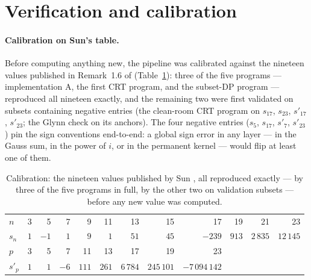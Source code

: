 \documentclass[10pt]{article}
\theoremstyle{remark}
\begin{document}
\section{Verification and calibration}\label{sec:verification}

\paragraph{Calibration on Sun's table.}
Before computing anything new, the pipeline was calibrated against the
nineteen values published in Remark~1.6 of \cite{Sun2021}
(Table~\ref{tab:calibration}): three of the five programs ---
implementation A, the first CRT program, and the subset-DP program ---
reproduced all nineteen exactly, and the remaining two were first
validated on subsets containing negative entries (the clean-room CRT
program on $s_{17}$, $s_{23}$, $s'_{17}$, $s'_{23}$; the Glynn check on
its anchors). The four negative entries ($s_5$, $s_{17}$, $s'_7$,
$s'_{23}$) pin the sign conventions end-to-end: a global sign error in any
layer --- in the Gauss sum, in the power of $i$, or in the permanent
kernel --- would flip at least one of them.

\begin{table}[ht]
\centering\footnotesize
\setlength{\tabcolsep}{5.5pt}
\begin{tabular}{@{}lrrrrrrrrrrr@{}}
\toprule
$n$    & 3 & 5 & 7 & 9 & 11 & 13 & 15 & 17 & 19 & 21 & 23 \\
$s_n$  & $1$ & $-1$ & $1$ & $9$ & $1$ & $51$ & $45$ & $-239$ & $913$ & $2\,835$ & $12\,145$ \\
\midrule
$p$    & 3 & 5 & 7 & 11 & 13 & 17 & 19 & 23 & & & \\
$s'_p$ & $1$ & $1$ & $-6$ & $111$ & $261$ & $6\,784$ & $245\,101$ & $-7\,094\,142$ & & & \\
\bottomrule
\end{tabular}
\caption{Calibration: the nineteen values published by Sun
\cite[Remark~1.6]{Sun2021}, all reproduced exactly --- by three of the
five programs in full, by the other two on validation subsets --- before
any new value was computed.}
\label{tab:calibration}
\end{table}
\end{document}
